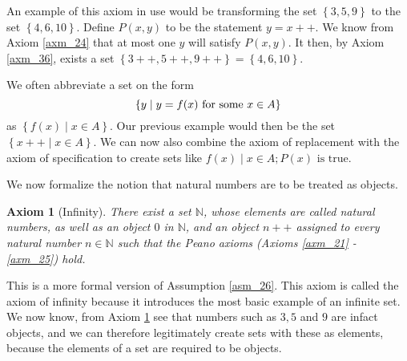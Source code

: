 \documentclass[a4paper, twocolumn]{report}
\newcounter{axmcntr} \numberwithin{axmcntr}{chapter}
\newtheorem{axm}[axmcntr]{Axiom}
\theoremstyle{definition}
\theoremstyle{solution}
\newcommand{\dplus}{{+}{+}} %
\begin{document}
An example of this axiom in use would be transforming the set $\left\{ 3, 5, 9
\right\}$ to the set $\left\{ 4, 6, 10 \right\}$.  Define $P(x, y)$ to be the
statement $y = x\dplus$. We know from Axiom \ref{axm_24} that at most one $y$
will satisfy $P(x, y)$.  It then, by Axiom \ref{axm_36}, exists a set $\left\{
3\dplus, 5\dplus, 9\dplus \right\} = \left\{ 4, 6, 10 \right\}$.

We often abbreviate a set on the form
\begin{equation}
  \notag
  \left\{ y \mid y = f(x) \text{ for some } x \in A \right\}
\end{equation}
as $\left\{ f(x) \mid x \in A \right\}$. Our previous example would then be the
set $\left\{ x\dplus \mid x \in A \right\}$.  We can now also combine the axiom
of replacement with the axiom of specification to create sets like $f(x) \mid x
\in A; P(x) \text{ is true}$.

We now formalize the notion that natural numbers are to be treated as objects.
\begin{axm}[Infinity]
  \label{axm_37}  
  There exist a set $\mathbb{N}$, whose elements are called natural numbers, as
  well as an object $0$ in $\mathbb{N}$, and an object $n++$ assigned to every
  natural number $n \in \mathbb{N}$ such that the Peano axioms (Axioms
  \ref{axm_21} - \ref{axm_25}) hold.
\end{axm}
This is a more formal version of Assumption \ref{asm_26}. This axiom is called
the axiom of infinity because it introduces the most basic example of an
infinite set. We now know, from Axiom \ref{axm_37} see that numbers such as $3,
5$ and $9$ are infact objects, and we can therefore legitimately create sets
with these as elements, because the elements of a set are required to be
objects.
\end{document}
